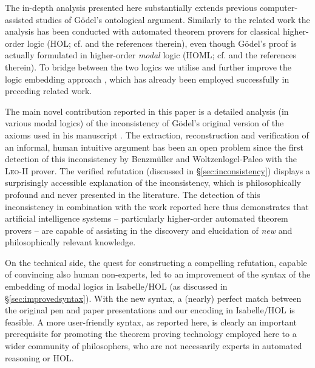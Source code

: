 \documentclass{article}
\begin{document}
The in-depth analysis presented here substantially
extends previous computer-assisted studies of G\"odel's ontological
argument. Similarly to the related work \cite{J30,C40} the analysis has
been conducted with automated theorem provers for classical
higher-order logic (HOL; cf. \cite{andrewsSEP} and the references
therein), even though G\"odel's proof is actually formulated in
higher-order \emph{modal} logic (HOML; cf. \cite{homl} and the
references therein). To bridge between the two logics we utilise and
further improve the logic embedding approach \cite{J23,C40}, which has
already been employed successfully in preceding related work.

The main novel contribution reported in this paper is a detailed
analysis (in various modal logics) of the inconsistency of G\"{o}del's
original version of the axioms used in his manuscript
. The extraction, reconstruction and
verification of an informal, human intuitive argument has been an open
problem since the first detection of this inconsistency by
Benzm\"uller and Woltzenlogel-Paleo  with the
\textsc{Leo-II} prover.  The verified refutation (discussed in
\S\ref{sec:inconsistency}) displays a surprisingly accessible
explanation of the inconsistency, which is philosophically profound
and never presented in the literature. The detection of this
inconsistency in combination with the work reported here thus
demonstrates that artificial intelligence systems -- particularly
higher-order automated theorem provers -- are capable of assisting in
the discovery and elucidation of \emph{new} and philosophically
relevant knowledge.

On the technical side, the quest for constructing a compelling
refutation, capable of convincing also human non-experts, led to an
improvement of the syntax of the embedding of modal logics in Isabelle/HOL
(as discussed in \S\ref{sec:improvedsyntax}). With the new syntax, a
(nearly) perfect match between the original pen and paper
presentations and our encoding in Isabelle/HOL is feasible. A more
user-friendly syntax, as reported here, is clearly an important
prerequisite for promoting the theorem proving technology employed
here to a wider community of philosophers, who are not necessarily
experts in automated reasoning or HOL.
\end{document}
